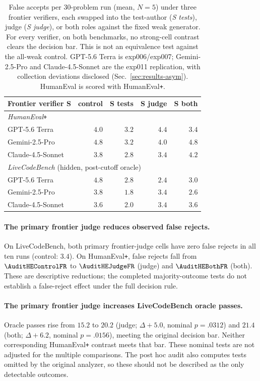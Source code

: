 \begin{table}[t]
\centering
\small
\caption{False accepts per 30-problem run (mean, $N{=}5$) under three frontier verifiers, each
swapped into the test-author (\emph{S tests}), judge (\emph{S judge}), or both roles against the
fixed weak generator. For every verifier, on both benchmarks, no strong-cell contrast clears the
decision bar. This is not an equivalence test against the all-weak control.
GPT-5.6 Terra is exp006/exp007; Gemini-2.5-Pro and Claude-4.5-Sonnet are the exp011
replication, with collection deviations disclosed (Sec.~\ref{sec:results-asym}). HumanEval is scored with HumanEval\texttt{+}.}
\label{tab:verifiers}
\begin{tabular}{lrrrr}
\toprule
Frontier verifier S & control & S tests & S judge & S both \\
\midrule
\multicolumn{5}{l}{\emph{HumanEval}\texttt{+}} \\
\quad GPT-5.6 Terra     & $4.0$ & $3.2$ & $4.4$ & $3.4$ \\
\quad Gemini-2.5-Pro    & $4.8$ & $3.2$ & $4.0$ & $4.8$ \\
\quad Claude-4.5-Sonnet & $3.8$ & $2.8$ & $3.4$ & $4.2$ \\
\midrule
\multicolumn{5}{l}{\emph{LiveCodeBench} (hidden, post-cutoff oracle)} \\
\quad GPT-5.6 Terra     & $4.8$ & $2.8$ & $2.4$ & $3.0$ \\
\quad Gemini-2.5-Pro    & $3.8$ & $1.8$ & $3.4$ & $2.6$ \\
\quad Claude-4.5-Sonnet & $3.6$ & $2.0$ & $3.4$ & $3.6$ \\
\bottomrule
\end{tabular}
\end{table}



\paragraph{The primary frontier judge reduces observed false rejects.} On LiveCodeBench,
both primary frontier-judge cells have zero false rejects in all ten runs (control: $3.4$).
On HumanEval\texttt{+}, false rejects fall from $\AuditHEControlFR$ to $\AuditHEJudgeFR$
(judge) and $\AuditHEBothFR$ (both). These are descriptive reductions; the completed
majority-outcome tests do not establish a false-reject effect under the full decision rule.

\paragraph{The primary frontier judge increases LiveCodeBench oracle passes.} Oracle
passes rise from $15.2$ to $20.2$ (judge; $\Delta{+}5.0$, nominal $p{=}.0312$) and $21.4$
(both; $\Delta{+}6.2$, nominal $p{=}.0156$), meeting the original decision bar. Neither
corresponding HumanEval\texttt{+} contrast meets that bar. These nominal tests are not
adjusted for the multiple comparisons. The post hoc audit also computes tests omitted by
the original analyzer, so these should not be described as the only detectable outcomes.

